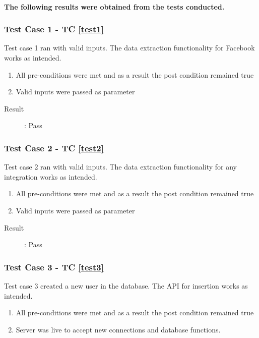 \documentclass{article}
\begin{document}
\paragraph{The following results were obtained from the tests conducted.}
\subsubsection{Test Case 1 - TC \ref{test1}}
Test case 1 ran with valid inputs.
The data extraction functionality for Facebook works as intended.
\begin{enumerate}
	\item All pre-conditions were met and as a result the post condition remained true
	\item Valid inputs were passed as parameter 
\end{enumerate}
\begin{description}
	\item [Result]: Pass 
\end{description}

\subsubsection{Test Case 2 - TC \ref{test2}}
Test case 2 ran with valid inputs.
The data extraction functionality for any integration works as intended.
\begin{enumerate}
	\item All pre-conditions were met and as a result the post condition remained true
	\item Valid inputs were passed as parameter 
\end{enumerate}

\begin{description}
	\item [Result]: Pass 
\end{description}

\subsubsection{Test Case 3 - TC \ref{test3}}
Test case 3 created a new user in the database.
The API for insertion works as intended.
\begin{enumerate}
	\item All pre-conditions were met and as a result the post condition remained true
	\item Server was live to accept new connections and database functions.
\end{enumerate}
\end{document}

